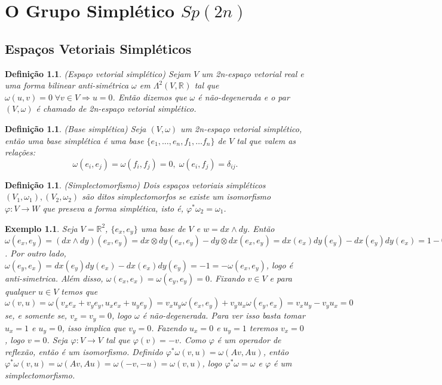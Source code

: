 \documentclass[12pt]{book}
\newtheorem{definicao}[teorema]{Definição}
\newtheorem{exemplo}[teorema]{Exemplo}
\newcommand{\gruposimpletico}[1]{Sp(#1)}
\newcommand{\real}[1]{\mathbb{R}^{#1}}
\begin{document}
	\chapter{O Grupo Simplético $\gruposimpletico{2n}$}
	
	\section{Espaços Vetoriais Simpléticos}
	\begin{definicao}
		(Espaço vetorial simplético) Sejam $V$ um 2n-espaço vetorial real e uma forma bilinear anti-simétrica $\omega$ em $\Lambda^{2}(V, \real{})$ tal que $\omega(u,v) = 0 \; \forall v \in V \Rightarrow u=0$. Então dizemos que $\omega$ é não-degenerada e o par $(V, \omega)$ é chamado de 2n-espaço vetorial simplético.
	\end{definicao}
	
	\begin{definicao}
		(Base simplética) Seja $(V, \omega)$ um 2n-espaço vetorial simplético, então uma base simplética é uma base $\{ e_{1},\dots, e_{n},f_{1},\dots f_{n}\}$ de $V$ tal que valem as relações:
		$$
		\omega(e_{i}, e_{j}) = \omega(f_{i}, f_{j}) = 0, \; \omega(e_{i}, f_{j}) = \delta_{ij}.
		$$
	\end{definicao}
	
	\begin{definicao}
		(Simplectomorfismo) Dois espaços vetoriais simpléticos $(V_{1}, \omega_{1}), (V_{2}, \omega_{2})$ são ditos simplectomorfos se existe um isomorfismo $\varphi:V\to W$ que preseva a forma simplética, isto é, $\varphi^{*}\omega_{2} = \omega_{1}$.
	\end{definicao}
	\begin{exemplo}
		Seja $V = \real{2}$, $\{e_{x}, e_{y}\}$ uma base de $V$ e $w=dx \wedge dy$. Então $\omega(e_{x}, e_{y}) = (dx \wedge dy)(e_{x}, e_{y}) = dx\otimes dy(e_{x}, e_{y})-dy\otimes dx(e_{x}, e_{y}) =dx(e_{x}) dy(e_{y}) - dx(e_{y}) dy(e_{x}) = 1-0= 1$. Por outro lado, $\omega(e_{y}, e_{x}) =dx(e_{y}) dy(e_{x}) - dx(e_{x}) dy(e_{y}) =-1 =-\omega(e_{x}, e_{y})$, logo é anti-simetrica. Além disso, $\omega(e_{x}, e_{x}) = \omega(e_{y}, e_{y}) = 0$. Fixando $v \in V$ e para qualquer $u \in V$ temos que $\omega(v, u) = \omega(v_{x}e_{x}+v_{y}e_{y}, u_{x}e_{x}+u_{y}e_{y}) = v_{x}u_{y}\omega(e_{x}, e_{y}) +v_{y}u_{x}\omega(e_{y}, e_{x}) = v_{x}u_{y} -v_{y}u_{x} = 0$ se, e somente se, $v_{x}=v_{y}=0$, logo $\omega$ é não-degenerada. Para ver isso basta tomar $u_{x} = 1$ e $u_{y} = 0$, isso implica que $v_{y} = 0$. Fazendo $u_{x} = 0$ e $u_{y} = 1$ teremos $v_{x} = 0$, logo $v=0$. Seja $\varphi:V \to V$ tal que $\varphi(v) = -v$. Como $\varphi$ é um operador de reflexão, então é um isomorfismo. Definido $\varphi^{*}\omega(v, u) = \omega(Av, Au)$, então $\varphi^{*}\omega(v, u) = \omega(Av, Au)=\omega(-v, -u)=\omega(v, u)$, logo $\varphi^{*}\omega = \omega$ e $\varphi$ é um simplectomorfismo.
	\end{exemplo}
	
\end{document}

